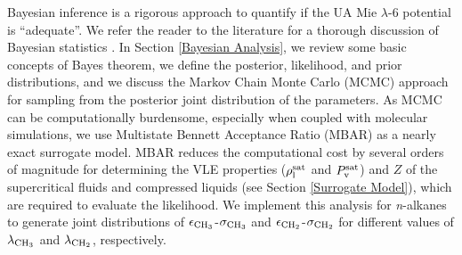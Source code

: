 \documentclass[journal=jctc,manuscript=article]{achemso}
\begin{document}
Bayesian inference is a rigorous approach to quantify if the UA Mie $\lambda$-6 potential is ``adequate''. 
We refer the reader to the literature for a thorough discussion of Bayesian statistics \cite{Bay_Deriv,Bay_MD,Bay_UQ,Wu2016,Kulakova2017}. In Section \ref{Bayesian Analysis}, we review some basic concepts of Bayes theorem, we define the posterior, likelihood, and prior distributions, and we discuss the Markov Chain Monte Carlo (MCMC) approach
for sampling from the posterior joint distribution of the parameters.
As MCMC can be computationally burdensome, especially when coupled with molecular simulations, we use Multistate Bennett Acceptance Ratio (MBAR) as a 
nearly exact
surrogate model. MBAR reduces the computational cost by several orders of magnitude for determining the VLE properties ($\rho_{\rm l}^{\rm sat}$ and $P_{\rm v}^{\rm sat}$) and $Z$ of the supercritical fluids and compressed liquids (see Section \ref{Surrogate Model}), 
which are required to evaluate the likelihood. 
We implement this analysis for \textit{n}-alkanes to generate joint distributions of $\epsilon_{\rm CH_3}$-$\sigma_{\rm CH_3}$ and $\epsilon_{\rm CH_2}$-$\sigma_{\rm CH_2}$ for different values of $\lambda_{\rm CH_3}$ and $\lambda_{\rm CH_2}$, respectively.
\end{document}
